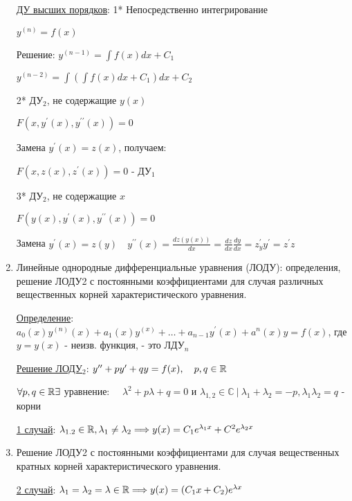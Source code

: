 \documentclass[12pt]{article}
\begin{document}
\begin{enumerate}
        \hyperlink{differentilaequationshigherdegree}{ДУ высших порядков}:     1* Непосредственно интегрирование

        $y^{(n)} = f(x)$

        Решение: $y^{(n - 1)} = \int f(x) dx + C_1$

        $y^{(n - 2)} = \int (\int f(x) dx + C_1) dx + C_2$

        2* ДУ$_2$, не содержащие $y(x)$

        $F(x, y^\prime(x), y^{\prime\prime}(x)) = 0$

        Замена $y^\prime(x) = z(x)$, получаем:

        $F(x, z(x), z^\prime(x)) = 0$ - ДУ$_1$

        3* ДУ$_2$, не содержащие $x$

        $F(y(x), y^\prime(x), y^{\prime\prime}(x)) = 0$

        Замена $y^\prime(x) = z(y) \quad y^{\prime\prime}(x) = \frac{dz(y(x))}{dx} = \frac{dz}{dx} \frac{dy}{dx} = z^\prime_y y^\prime = z^\prime z$


        \item Линейные однородные дифференциальные уравнения (ЛОДУ): определения, решение ЛОДУ2 с постоянными коэффициентами для случая различных вещественных корней характеристического уравнения.

        \hyperlink{lineardifferentialequationhigherdegree}{Определение}: $a_0(x) y^{(n)}(x) + a_1(x)y^{(x)} + \dots + a_{n - 1}y^\prime(x) + a^n(x)y = f(x)$, где $y = y(x)$ - неизв. функция, - это ЛДУ$_n$

        \hyperlink{lineardifferentialequationseconddegreewithconstants}{Решение ЛОДУ$_2$}: $y^{\prime\prime} + p y^\prime + q y = f(x), \quad p, q \in \mathbb{R}$

        $\forall p, q \in \mathbb{R} \exists $ уравнение: $\quad \lambda^2 + p\lambda + q = 0$ и $\lambda_{1,2} \in \mathbb{C} \ | \ \lambda_1 + \lambda_2 = -p, \lambda_1 \lambda_2 = q$ - корни

        \hyperlink{ldesgdifferentrealsolutions}{1 случай}: $\lambda_{1.2} \in \mathbb{R}, \lambda_1 \neq \lambda_2 \Longrightarrow y(x) = C_1 e^{\lambda_1 x} + C^2 e^{\lambda_2 x}$

        \item Решение ЛОДУ2 с постоянными коэффициентами для случая вещественных кратных корней характеристического уравнения.

        \hyperlink{ldesgequalrealsolutions}{2 случай}: $\lambda_1 = \lambda_2 = \lambda \in \mathbb{R} \Longrightarrow y(x) = (C_1 x + C_2)e^{\lambda x}$



\end{enumerate}
\end{document}
